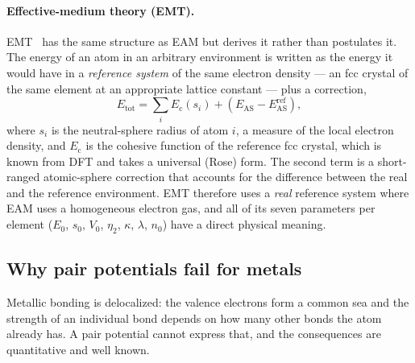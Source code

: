 \documentclass[11pt,a4paper]{article}
\numberwithin{equation}{section}
\theoremstyle{remark}
\begin{document}
\paragraph{Effective-medium theory (EMT).}
EMT~\citep{jacobsen1987, jacobsen1996} has the same structure as EAM but derives it rather than
postulates it. The energy of an atom in an arbitrary environment is written as the energy it would
have in a \emph{reference system} of the same electron density --- an fcc crystal of the same element
at an appropriate lattice constant --- plus a correction,
\begin{equation}\label{eq:emt}
  E_{\mathrm{tot}} = \sum_i E_{\mathrm{c}}(s_i)
  + \left(E_{\mathrm{AS}} - E_{\mathrm{AS}}^{\mathrm{ref}}\right),
\end{equation}
where $s_i$ is the neutral-sphere radius of atom $i$, a measure of the local electron density, and
$E_{\mathrm{c}}$ is the cohesive function of the reference fcc crystal, which is known from DFT and
takes a universal (Rose) form. The second term is a short-ranged atomic-sphere correction that
accounts for the difference between the real and the reference environment. EMT therefore uses a
\emph{real} reference system where EAM uses a homogeneous electron gas, and all of its seven
parameters per element ($E_0$, $s_0$, $V_0$, $\eta_2$, $\kappa$, $\lambda$, $n_0$) have a direct
physical meaning.

\subsection{Why pair potentials fail for metals}\label{sec:pairfail}

Metallic bonding is delocalized: the valence electrons form a common sea and the strength of an
individual bond depends on how many other bonds the atom already has. A pair potential cannot express
that, and the consequences are quantitative and well known.
\end{document}
